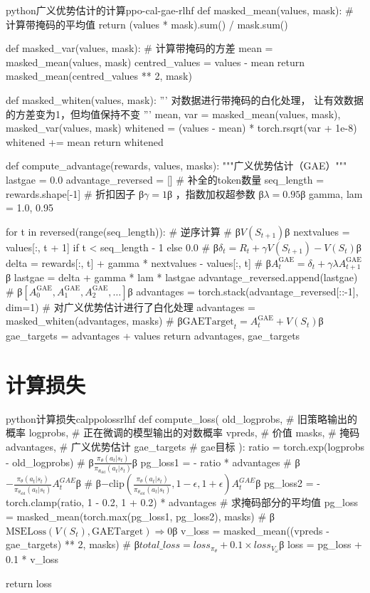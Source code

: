 \documentclass[lang=cn,newtx,10pt,scheme=chinese]{elegantbook}
\begin{document}
\begin{codebox}{python}{广义优势估计的计算}{ppo-cal-gae-rlhf}
def masked_mean(values, mask):
    # 计算带掩码的平均值
    return (values * mask).sum() / mask.sum()

def masked_var(values, mask):
    # 计算带掩码的方差
    mean = masked_mean(values, mask)
    centred_values = values - mean
    return masked_mean(centred_values ** 2, mask)

def masked_whiten(values, mask):
    '''
    对数据进行带掩码的白化处理，
    让有效数据的方差变为1，但均值保持不变
    '''
    mean, var = masked_mean(values, mask), masked_var(values, mask)
    whitened = (values - mean) * torch.rsqrt(var + 1e-8)
    whitened += mean
    return whitened

def compute_advantage(rewards, values, masks):
    """广义优势估计（GAE）"""
    lastgae = 0.0
    advantage_reversed = []
    # 补全的token数量
    seq_length = rewards.shape[-1]
    # 折扣因子 β$\gamma=1$β ，指数加权超参数 β$\lambda=0.95$β
    gamma, lam = 1.0, 0.95

    for t in reversed(range(seq_length)): # 逆序计算
        # β$V(S_{t+1})$β
        nextvalues = values[:, t + 1] if t < seq_length - 1 else 0.0
        # β$\delta_t = R_t + \gamma V(S_{t+1}) - V(S_t)$β
        delta = rewards[:, t] + gamma * nextvalues - values[:, t]
        # β$A_t^{\text{GAE}} = \delta_t +\gamma\lambda A_{t+1}^{\text{GAE}}$β
        lastgae = delta + gamma * lam * lastgae
        advantage_reversed.append(lastgae)
    # β$[A_0^{\text{GAE}},A_1^{\text{GAE}},A_2^{\text{GAE}},\dots]$β
    advantages = torch.stack(advantage_reversed[::-1], dim=1)
    # 对广义优势估计进行了白化处理
    advantages = masked_whiten(advantages, masks)
    # β$\text{GAETarget}_t=A_t^{\text{GAE}}+V(S_t)$β
    gae_targets = advantages + values
    return advantages, gae_targets
\end{codebox}

\section{计算损失}

\begin{codebox}{python}{计算损失}{calppolossrlhf}
def compute_loss(
    old_logprobs, # 旧策略输出的概率
    logprobs, # 正在微调的模型输出的对数概率
    vpreds, # 价值
    masks, # 掩码
    advantages, # 广义优势估计
    gae_targets # gae目标
):
    ratio = torch.exp(logprobs - old_logprobs) # β$\frac{\pi_\theta(a_t|s_t)}{\pi_{\theta_\text{old}}(a_t|s_t)}$β
    pg_loss1 = - ratio * advantages # β$-\frac{\pi_\theta(a_t|s_t)}{\pi_{\theta_\text{old}}(a_t|s_t)}A_t^{GAE}$β
    # β$-\text{clip}\left( \frac{\pi_\theta(a_t|s_t)}{\pi_{\theta_\text{old}}(a_t|s_t)},1-\epsilon,1+\epsilon \right)A_t^{GAE}$β
    pg_loss2 = - torch.clamp(ratio, 1 - 0.2, 1 + 0.2) * advantages
    # 求掩码部分的平均值
    pg_loss = masked_mean(torch.max(pg_loss1, pg_loss2), masks)
    # β$\text{MSELoss}(V(S_t), \text{GAETarget})\Rightarrow 0$β
    v_loss = masked_mean((vpreds - gae_targets) ** 2, masks)
    # β$total\_loss=loss_{\pi_\theta}+0.1\times loss_{V_\omega}$β
    loss = pg_loss + 0.1 * v_loss

    return loss
\end{codebox}
\end{document}

